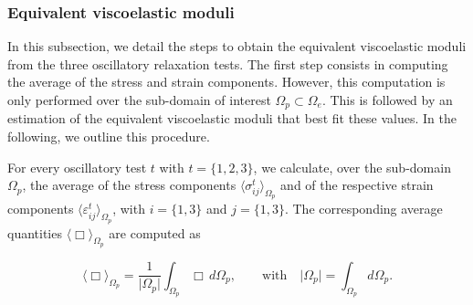 \documentclass[draft]{agujournal2019}
\begin{document}
\subsubsection{Equivalent viscoelastic moduli}
In this subsection, we detail the steps to obtain the equivalent viscoelastic moduli from the three oscillatory relaxation tests. The first step consists in computing the average of the  stress and strain components. However, this computation is only performed over the sub-domain of interest $\Omega_p \subset \Omega_e$. This is followed by an estimation of the equivalent viscoelastic moduli that best fit these values. In the following, we outline this procedure.

For every oscillatory test $t$ with $t = \{1,2,3\}$, we calculate, over the sub-domain $\Omega_p$, the average  of the stress components $\langle \sigma_{ij}^t \rangle_{\Omega_p}$ and of the respective strain components $\langle \varepsilon_{ij}^t \rangle_{\Omega_p}$, with $i=\{1,3\}$ and $j=\{1,3\}$. The corresponding average quantities $\langle \Box \rangle_{\Omega_p}$ are computed as
\begin{linenomath*}
\begin{equation}\label{Eq.12}
  \langle \Box \rangle_{\Omega_p} = \frac{1}{\vert \Omega_p \vert} \int_{\Omega_p} \Box \, d\Omega_p, \qquad \text{with} \quad  \vert \Omega_p \vert = \int_{\Omega_p}  d \Omega_p.
\end{equation}
\end{linenomath*}
\end{document}
